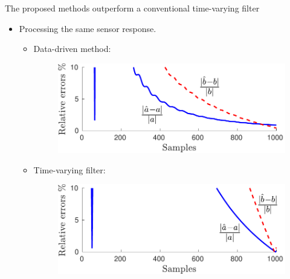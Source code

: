 \documentclass[presentation]{beamer}
\begin{document}
\begin{frame}[label={slide:affine-input-estimation6}]{The proposed methods outperform \linebreak a conventional time-varying filter}
\begin{itemize}
	\color{blue}
	\item Processing the same sensor response. 
	\begin{itemize}
		\item Data-driven method:
		\begin{figure}
  			\centering
  			\includegraphics[width=0.65\columnwidth]{./fig/Aff_Fig_4.pdf} 
		\end{figure}
		\item Time-varying filter:
		\begin{figure}
  			\centering
  			\includegraphics[width=0.65\columnwidth]{./fig/Aff_Fig_10.pdf} 
		\end{figure}
	\end{itemize}
\end{itemize}
\end{frame}

\end{document}
